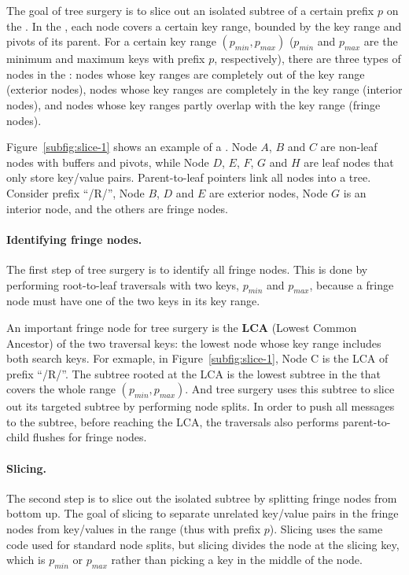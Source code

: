 The goal of tree surgery is to slice out an isolated subtree of a certain
prefix $p$ on the \bet.
In the \bet, each node covers a certain key range, bounded by the key range and
pivots of its parent.
For a certain key range $(p_{min}, p_{max})$ ($p_{min}$ and $p_{max}$ are the
minimum and maximum keys with prefix $p$, respectively), there are three types
of nodes in the \bet:
nodes whose key ranges are completely out of the key range (exterior nodes),
nodes whose key ranges are completely in the key range (interior nodes),
and nodes whose key ranges partly overlap with the key range (fringe nodes).

Figure~\ref{subfig:slice-1} shows an example of a \bet.
Node $A$, $B$ and $C$ are non-leaf nodes with buffers and pivots, while
Node $D$, $E$, $F$, $G$ and $H$ are leaf nodes that only store key/value pairs.
Parent-to-leaf pointers link all nodes into a tree.
Consider prefix ``/R/'',
Node $B$, $D$ and $E$ are exterior nodes, Node $G$ is an interior node,
and the others are fringe nodes.

\paragraph{Identifying fringe nodes.}
The first step of tree surgery is to identify all fringe nodes.
This is done by performing root-to-leaf traversals with two keys,
$p_{min}$ and $p_{max}$,
because a fringe node must have one of the two keys in its key range.

An important fringe node for tree surgery is the \textbf{LCA}
(Lowest Common Ancestor) of the two traversal keys: the lowest \bet node
whose key range includes both search keys.
For exmaple, in Figure~\ref{subfig:slice-1}, Node C is the LCA of prefix ``/R/''.
The subtree rooted at the LCA is the lowest subtree in the \bet that covers
the whole range $(p_{min}, p_{max})$.
And tree surgery uses this subtree to slice out its targeted subtree
by performing node splits.
In order to push all messages to the subtree, before reaching the LCA,
the traversals also performs parent-to-child flushes for fringe nodes.

\paragraph{Slicing.}
The second step is to slice out the isolated subtree by splitting fringe nodes
from bottom up.
The goal of slicing to separate unrelated key/value pairs in the fringe nodes
from key/values in the range (thus with prefix $p$).
Slicing uses the same code used for standard \bet node splits, but slicing
divides the node at the slicing key, which is $p_{min}$ or $p_{max}$ rather than
picking a key in the middle of the node.

